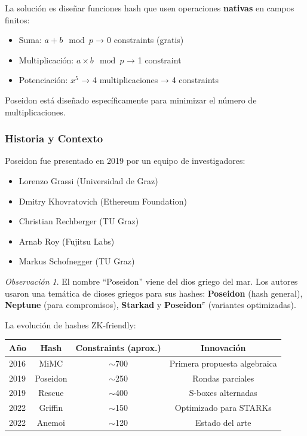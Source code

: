 \documentclass[11pt,a4paper,twoside,openright]{book}
\theoremstyle{definition}
\theoremstyle{plain}
\theoremstyle{remark}
\newtheorem{remark}{Observación}[chapter]
\begin{document}
\begin{keyidea}
La solución es diseñar funciones hash que usen operaciones \textbf{nativas} en campos finitos:
\begin{itemize}
    \item Suma: $a + b \mod p$ → 0 constraints (gratis)
    \item Multiplicación: $a \times b \mod p$ → 1 constraint
    \item Potenciación: $x^5$ → 4 multiplicaciones → 4 constraints
\end{itemize}

Poseidon está diseñado específicamente para minimizar el número de multiplicaciones.
\end{keyidea}

\subsubsection{Historia y Contexto}

Poseidon fue presentado en 2019 por un equipo de investigadores:
\begin{itemize}
    \item Lorenzo Grassi (Universidad de Graz)
    \item Dmitry Khovratovich (Ethereum Foundation)
    \item Christian Rechberger (TU Graz)
    \item Arnab Roy (Fujitsu Labs)
    \item Markus Schofnegger (TU Graz)
\end{itemize}

\begin{remark}
El nombre ``Poseidon'' viene del dios griego del mar. Los autores usaron una temática de dioses griegos para sus hashes: \textbf{Poseidon} (hash general), \textbf{Neptune} (para compromisos), \textbf{Starkad} y \textbf{Poseidon$^\pi$} (variantes optimizadas).
\end{remark}

La evolución de hashes ZK-friendly:
\begin{center}
\begin{tabular}{lccc}
\toprule
\textbf{Año} & \textbf{Hash} & \textbf{Constraints (aprox.)} & \textbf{Innovación} \\
\midrule
2016 & MiMC & $\sim$700 & Primera propuesta algebraica \\
2019 & Poseidon & $\sim$250 & Rondas parciales \\
2019 & Rescue & $\sim$400 & S-boxes alternadas \\
2022 & Griffin & $\sim$150 & Optimizado para STARKs \\
2022 & Anemoi & $\sim$120 & Estado del arte \\
\bottomrule
\end{tabular}
\end{center}
\end{document}
